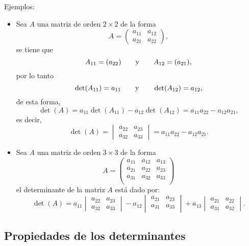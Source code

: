 \documentclass[a4,11pt]{aleph-notas}
\begin{document}
Ejemplos:
\begin{itemize}
\item 
    Sea $A$ una matriz de orden $2 \times 2$ de la forma
    \[ 
        A=
        \begin{pmatrix}
         a_{11} & a_{12}\\
         a_{21} & a_{22}
        \end{pmatrix},
    \]
    se tiene que
    \[
        A_{11} = (a_{22})
        \qquad\text{y}\qquad
        A_{12} = (a_{21}),
    \]
    por lo tanto
    \[
        \det(A_{11}) = a_{11}
        \qquad\text{y}\qquad
        \det(A_{12}) = a_{12},
    \]
    de esta forma,
    \[
        \det(A) = a_{11}\det(A_{11}) - a_{12}\det(A_{12})
            = a_{11}a_{22} - a_{12}a_{21},
    \]
    es decir,
    \[
        \det(A) = \begin{vmatrix}
        a_{22} & a_{23} \\
        a_{32} & a_{33}
        \end{vmatrix}
        = a_{11}a_{22} - a_{12}a_{21}.
    \]
\item Sea $A$ una matriz de orden $3 \times 3$ de la forma
         \[ A=
        \begin{pmatrix}
         a_{11} & a_{12} & a_{13}\\
         a_{21} & a_{22} & a_{23}\\
         a_{31} & a_{32} & a_{33}\\
        \end{pmatrix}
        \]
        \noindent el determinante de la matriz $A$ está dado por:
        \[
        \det(A) = a_{11}
        \begin{vmatrix}
        a_{22} & a_{23} \\
        a_{32} & a_{33}
        \end{vmatrix} - a_{12}
        \begin{vmatrix}
        a_{21} & a_{23} \\
        a_{31} & a_{33} \\
        \end{vmatrix}+ a_{13}
        \begin{vmatrix}
        a_{21} & a_{22} \\
        a_{31} & a_{32}
        \end{vmatrix}.
        \]
\end{itemize}

\subsection{Propiedades de los determinantes}
\end{document}
